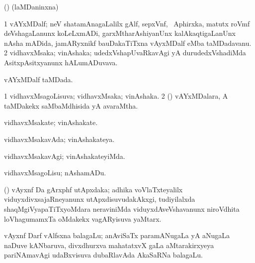 \bentry
{}
\gl{\saMkiSx}
\expl{}
\bmng
 (\birx) (laMDaninxna)  
\emng
\eentry

\bentry
{} 
\gl{\nA}
\expl{}
\bmng
\bnum
\num{1}  vAYxMDalf; neV shatamAnagaLalilx gAlf, sepxVnf, \kanu\ Aphirxka, matutx roVmf deVshagaLanunx koLeLxmADi, garxMtharAshiyanUnx kalAkaqtigaLanUnx nAsha mADida, jamARyxnikf bauDakaTiTxna vAyxMDalf eMba taMDadavanu. 
\num{2} vidhavxMsaka; vinAshaka; udedxVshapUvaRkavAgi yA durudedxVshadiMda AsitxpAsitxyanunx hALumADuvava. 
\enum
\emng
\eentry

\bentry
{} 
\gl{\gu}
\expl{}
\bmng
 vAYxMDalf taMDada. 
\emng
\eentry

\bentry
{} 
\gl{\gu}
\expl{}
\bmng
\bnum
\num{1} vidhavxMsagoLisuva; vidhavxMsaka; vinAshaka. 
\num{2} () vAYxMDalara, A taMDakekx saMbaMdhisida yA avaraMtha. 
\enum
\emng
\eentry

\bentry
{} 
\gl{\nA}
\expl{}
\bmng
 vidhavxMsakate; vinAshakate. 
\emng
\eentry

\bentry
{} 
\gl{\gu}
\expl{}
\bmng
 vidhavxMsakavAda; vinAshakateya. 
\emng
\eentry

\bentry
{} 
\gl{\kirxvi}
\expl{}
\bmng
 vidhavxMsakavAgi; vinAshakateyiMda. 
\emng
\eentry

\bentry
{} 
\gl{\sakirx}
\expl{}
\bmng
 vidhavxMsagoLisu; nAshamADu. 
\emng
\eentry

\bentry
{} 
\gl{\nA}
\expl{}
\bmng
 (\viduyx) vAyxnf Da gArxphf utApxdaka; adhika voVlaTxteyalilx viduyxdivxsajaRneyanunx utApxdisuvudakAkxgi, tudiyilalxda shaqMgiVyapaTiTxyoMdara neraviniMda viduyxdAveVshavanunx niroVdhita  loVhagumamxTa oMdakekx vagARyisuva yaMtarx. 
\emng
\eentry

\bentry
{}
\gl{\nA}
\expl{(\bava) (\ravi)}
\bmng
 vAyxnf Darf vAlfsxna balagaLu; anAviSaTx paramANugaLa yA aNugaLa naDuve kANbaruva, divxdhurxva mahatatxvX  gaLa aMtarakirxyeya pariNAmavAgi udaBxvisuva dubaRlavAda AkaSaRNa balagaLu. 
\emng
\eentry

